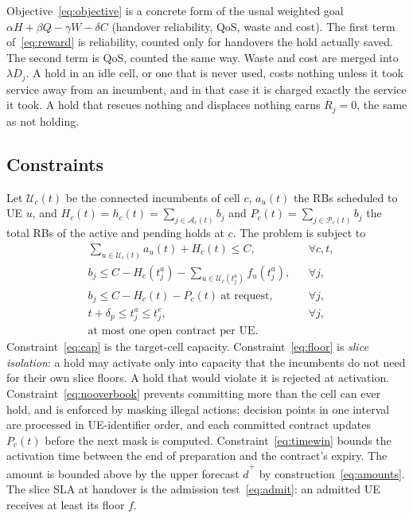 \documentclass[conference]{IEEEtran}
\begin{document}
Objective~\eqref{eq:objective} is a concrete form of the usual weighted goal $\alpha H+\beta Q-\gamma W-\delta C$ (handover reliability, QoS, waste and cost). The first term of~\eqref{eq:reward} is reliability, counted only for handovers the hold actually saved. The second term is QoS, counted the same way. Waste and cost are merged into $\lambda D_j$. A hold in an idle cell, or one that is never used, costs nothing unless it took service away from an incumbent, and in that case it is charged exactly the service it took. A hold that rescues nothing and displaces nothing earns $R_j=0$, the same as not holding.

\subsection{Constraints}
Let $\mathcal{U}_c(t)$ be the connected incumbents of cell $c$, $a_u(t)$ the RBs scheduled to UE $u$, and $H_c(t)=h_c(t)=\sum_{j\in\mathcal{A}_c(t)}b_j$ and $P_c(t)=\sum_{j\in\mathcal{P}_c(t)}b_j$ the total RBs of the active and pending holds at $c$. The problem is subject to
\begin{align}
&\textstyle\sum_{u\in\mathcal{U}_c(t)}a_u(t)+H_c(t)\le C, &&\forall c,t,\label{eq:cap}\\
&b_j\le C-H_c(t^{a}_j)-\textstyle\sum_{u\in\mathcal{U}_c(t^{a}_j)}f_u(t^{a}_j), &&\forall j,\label{eq:floor}\\
&b_j\le C-H_c(t)-P_c(t) \ \text{at request}, &&\forall j,\label{eq:nooverbook}\\
&t+\delta_p\le t^{a}_j\le t^{e}_j, &&\forall j,\label{eq:timewin}\\
&\text{at most one open contract per UE}. &&\label{eq:onecontract}
\end{align}
Constraint~\eqref{eq:cap} is the target-cell capacity. Constraint~\eqref{eq:floor} is \emph{slice isolation}: a hold may activate only into capacity that the incumbents do not need for their own slice floors. A hold that would violate it is rejected at activation. Constraint~\eqref{eq:nooverbook} prevents committing more than the cell can ever hold, and is enforced by masking illegal actions; decision points in one interval are processed in UE-identifier order, and each committed contract updates $P_c(t)$ before the next mask is computed. Constraint~\eqref{eq:timewin} bounds the activation time between the end of preparation and the contract's expiry. The amount is bounded above by the upper forecast $\hat d^{+}$ by construction~\eqref{eq:amounts}. The slice SLA at handover is the admission test~\eqref{eq:admit}: an admitted UE receives at least its floor $f$.
\end{document}
